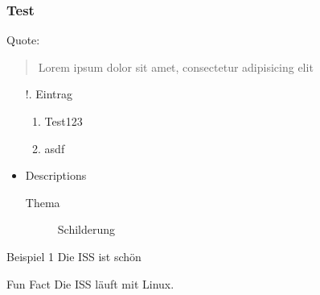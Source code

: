 
\begin{frame}
    \frametitle{Test}

    Quote:
    \begin{quote}
        Lorem ipsum dolor sit amet, consectetur adipisicing elit
    \end{quote}


    \begin{itemize}
        \item[!.] Eintrag
        \begin{enumerate}
            \item Test123
            \item asdf
        \end{enumerate}
        \item Descriptions
        \begin{description}
            \item[Thema] Schilderung
        \end{description}
    \end{itemize}

    \begin{exampleblock}{Beispiel 1}
        Die ISS ist schön
    \end{exampleblock}
    \begin{alertblock}{Fun Fact}
        Die ISS läuft mit Linux.
    \end{alertblock}

\end{frame}